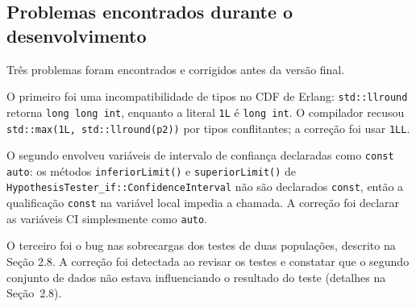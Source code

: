 \subsection{Problemas encontrados durante o desenvolvimento}

Três problemas foram encontrados e corrigidos antes da versão final.

O primeiro foi uma incompatibilidade de tipos no CDF de Erlang: \texttt{std::llround} retorna \texttt{long long int}, enquanto a literal \texttt{1L} é \texttt{long int}. O compilador recusou \texttt{std::max(1L, std::llround(p2))} por tipos conflitantes; a correção foi usar \texttt{1LL}.

O segundo envolveu variáveis de intervalo de confiança declaradas como \texttt{const auto}: os métodos \texttt{inferiorLimit()} e \texttt{superiorLimit()} de \texttt{HypothesisTester\_if::ConfidenceInterval} não são declarados \texttt{const}, então a qualificação \texttt{const} na variável local impedia a chamada. A correção foi declarar as variáveis CI simplesmente como \texttt{auto}.

O terceiro foi o bug nas sobrecargas dos testes de duas populações, descrito na Seção 2.8. A correção foi detectada ao revisar os testes e constatar que o segundo conjunto de dados não estava influenciando o resultado do teste (detalhes na Seção~2.8).

